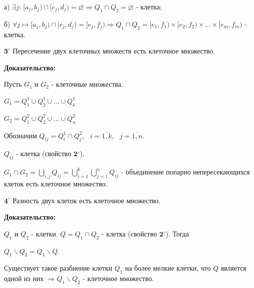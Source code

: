 \documentclass[a4paper,12pt]{article} %
\begin{document}
а) $\exists j$: $[a_j, b_j) \cap [c_j, d_j) = \varnothing \Rightarrow Q_1 \cap Q_2 = \varnothing $ - клетка;

б) $\forall j \longmapsto [a_j, b_j) \cap [c_j, d_j) = [e_j, f_j) \Rightarrow Q_1 \cap Q_2 = [e_1, f_1) \times [e_2, f_2) \times \ldots \times [e_m, f_m)$ - клетка.

\vspace{5mm}

$\textbf{3}^\circ$ Пересечение двух клеточных множеств есть клеточное множество.

\textbf{Доказательство:}

Пусть $G_1$ и $G_2$ - клеточные множества.

$G_1 = Q_1^1 \cup Q_2^1 \cup \ldots \cup Q_k^1$

$G_2 = Q_1^2 \cup Q_2^2 \cup \ldots \cup Q_n^2$

Обозначим $Q_{ij} = Q_i^1 \cap Q_j^2, \text{ } i = \overline{1, k}, \text{ } j = \overline{1, n}.$

$Q_{ij}$ - клетка (свойство $\textbf{2}^\circ$).

$G_1 \cap G_2 = \bigcup\limits_{i, j} Q_{ij} = \bigcup\limits_{i = 1}^k \bigcup\limits_{j = 1}^n Q_{ij}$ - объединение попарно непересекающихся клеток есть клеточное множество.

\vspace{5mm}

$\textbf{4}^\circ$ Разность двух клеток есть клеточное множество.

\textbf{Доказательство:}

$Q_1$ и $Q_2$ - клетки. $Q = Q_1 \cap Q_2$ - клетка (свойство $\textbf{2}^\circ$). Тогда

$Q_1 \backslash Q_2 = Q_1 \backslash Q$.

Существует такое разбиение клетки $Q_1$ на более мелкие клетки, что $Q$ является одной из них
$\Rightarrow Q_1 \backslash Q_2$ - клеточное множество.
\end{document}
